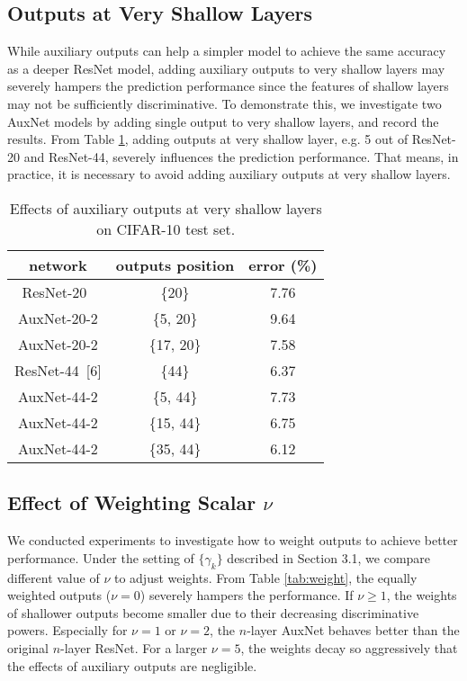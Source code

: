 \documentclass[10pt,onecolumn,letterpaper]{article}
\def\SexyName{AuxNet\xspace}
\begin{document}
\subsection{Outputs at Very Shallow Layers}\label{exp:shallowoutput}
While auxiliary outputs can help a simpler model to achieve the same accuracy as a deeper ResNet model, adding auxiliary outputs to very shallow layers may severely hampers the prediction performance since the features of shallow layers may not be sufficiently discriminative. To demonstrate this, we investigate two \SexyName models by adding single output to very shallow layers, and record the results.
From Table \ref{tab:shallow_layers}, adding outputs at very shallow layer, e.g. 5 out of ResNet-20 and ResNet-44, severely influences the prediction performance. That means, in practice, it is necessary to avoid adding auxiliary outputs at very shallow layers.

\begin{table}[t]
  \centering
  \caption{Effects of auxiliary outputs at very shallow layers on CIFAR-10 test set.}
    \begin{tabular}{c|c|c}
    \hline
    network & outputs position & error (\%) \\
    \hline
    ResNet-20~\cite{he2016identity} & \{20\} & 7.76 \\
    \SexyName-20-2 & \{5, 20\} & 9.64 \\
    \SexyName-20-2 & \{17, 20\} & 7.58 \\
    \hline
    ResNet-44~[6] & \{44\} & 6.37 \\
    \SexyName-44-2 & \{5, 44\} & 7.73 \\
    \SexyName-44-2 & \{15, 44\} & 6.75 \\
    \SexyName-44-2 & \{35, 44\} & 6.12 \\
    \hline
    \end{tabular}
  \label{tab:shallow_layers}%
\end{table}%






\subsection{Effect of Weighting Scalar $\nu$}\label{exp:nu}
We conducted experiments to investigate how to weight outputs to achieve better performance. Under the setting of $\{\gamma_k\}$ described in Section 3.1, we compare different value of $\nu$ to adjust weights. From Table \ref{tab:weight}, the equally weighted outputs ($\nu=0$) severely hampers the performance. If $\nu \geq 1$, the weights of shallower outputs become smaller due to their decreasing discriminative powers. Especially for $\nu=1$ or $\nu=2$, the $n$-layer \SexyName behaves better than the original $n$-layer ResNet. For a larger $\nu=5$, the weights decay so aggressively that the effects of auxiliary outputs are negligible.
\end{document}
